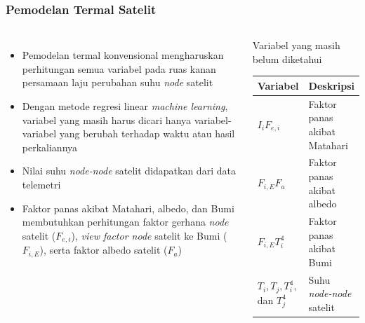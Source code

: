 \documentclass[8pt]{beamer}
\begin{document}
\begin{frame}
  \frametitle{Pemodelan Termal Satelit}
  \begin{columns}[T]
    \begin{itemize}
      \item Pemodelan termal konvensional mengharuskan perhitungan semua variabel pada ruas kanan persamaan laju perubahan suhu \textit{node} satelit
      \item Dengan metode regresi linear \textit{machine learning}, variabel yang masih harus dicari hanya variabel-variabel yang berubah terhadap waktu atau hasil perkaliannya
      \item Nilai suhu \textit{node-node} satelit didapatkan dari data telemetri
      \item Faktor panas akibat Matahari, albedo, dan Bumi membutuhkan perhitungan faktor gerhana \textit{node} satelit ($F_{e,i}$), \textit{view factor node} satelit ke Bumi ($F_{i,E}$), serta faktor albedo satelit ($F_a$)
    \end{itemize}
    \begin{block}{\center Variabel yang masih belum diketahui}
    \begin{table}[H]
\begin{center}
\begin{tabular}{|l|l|}
\hline
Variabel & Deskripsi \\ \hline
	$I_i F_{e,i}$        & Faktor panas akibat Matahari         \\ \hline
	$F_{i,E} F_a$        & Faktor panas akibat albedo         \\ \hline
	$F_{i,E} T_i^4$        & Faktor panas akibat Bumi         \\ \hline
	$T_i, T_j, T_i^4,$ dan $T_j^4$        & Suhu \textit{node-node} satelit         \\ \hline
\end{tabular}
\end{center}
\end{table}
    \end{block}
  \end{columns}
\end{frame}
\end{document}
